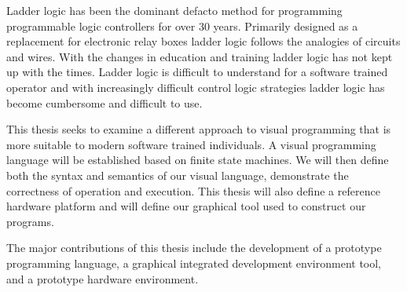 
Ladder logic has been the dominant defacto method for programming programmable logic controllers for over 30 years. Primarily designed as a replacement for electronic relay boxes ladder logic follows the analogies of circuits and wires. With the changes in education and training ladder logic has not kept up with the times. Ladder logic is difficult to understand for a software trained operator and with increasingly difficult control logic strategies ladder logic has become cumbersome and difficult to use.

This thesis seeks to examine a different approach to visual programming that is more suitable to modern software trained individuals. A visual programming language will be established based on finite state machines. We will then define both the syntax and semantics of our visual language, demonstrate the correctness of operation and execution. This thesis will also define a reference hardware platform and will define our graphical tool used to construct our programs.

The major contributions of this thesis include the development of a prototype programming language, a graphical integrated development environment tool, and a prototype hardware environment.
